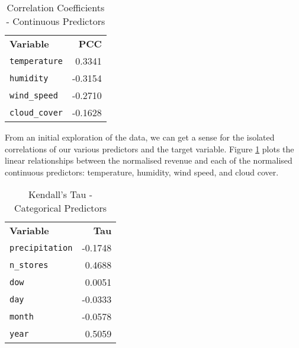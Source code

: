 \begin{table}[h]
\centering
\caption{Correlation Coefficients - Continuous Predictors}
\label{tab:correlation-numeric}
\begin{tabular}{@{} >{\arraybackslash}l r @{}}
\textbf{Variable} & \textbf{PCC} \\ \addlinespace[0.1em]
\toprule
\texttt{temperature} & 0.3341 \\
\texttt{humidity} & -0.3154 \\
\texttt{wind\_speed} & -0.2710 \\
\texttt{cloud\_cover} & -0.1628 \\
\bottomrule
\end{tabular}
\end{table}

From an initial exploration of the data, we can get a sense for the isolated
correlations of our various predictors and the target variable. Figure
\ref{tab:correlation-numeric} plots the linear relationships between the
normalised revenue and each of the normalised continuous predictors:
temperature, humidity, wind speed, and cloud cover. 

\begin{table}[h]
\centering
\caption{Kendall's Tau - Categorical Predictors}
\label{tab:correlation-categorical}
\begin{tabular}{@{} >{\arraybackslash}l r @{}}
\textbf{Variable} & \textbf{Tau} \\ \addlinespace[0.1em]
\toprule
\texttt{precipitation} & -0.1748 \\
\texttt{n\_stores} & 0.4688 \\
\texttt{dow} & 0.0051 \\
\texttt{day} & -0.0333 \\
\texttt{month} & -0.0578 \\
\texttt{year} & 0.5059 \\
\bottomrule
\end{tabular}
\end{table}

